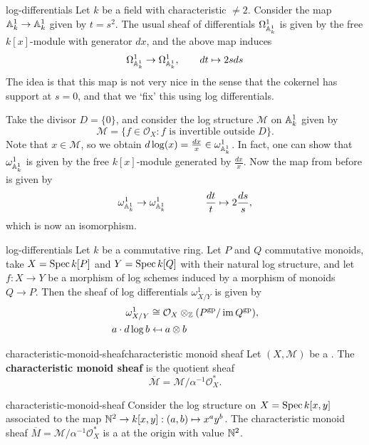 \begin{example}{log-differentials}
    Let $k$ be a field with characteristic $\ne 2$. Consider the map $\AA^1_k \to \AA^1_k$ given by $t = s^2$. The usual sheaf of differentials $\Omega^1_{\AA^1_k}$ is given by the free $k[x]$-module with generator $d x$, and the above map induces
    \[ \Omega^1_{\AA^1_k} \to \Omega^1_{\AA^1_k}, \qquad d t \mapsto 2 s d s \]
    The idea is that this map is not very nice in the sense that the cokernel has support at $s = 0$, and that we `fix' this using log differentials.
    
    Take the divisor $D = \{ 0 \}$, and consider the log structure $\mathcal{M}$ on $\AA^1_k$ given by
    \[ \mathcal{M} = \{ f \in \mathcal{O}_X : f \text{ is invertible outside } D \} . \]
    Note that $x \in \mathcal{M}$, so we obtain $d \log(x) = \frac{d x}{x} \in \omega^1_{\AA^1_k}$. In fact, one can show that $\omega^1_{\AA^1_k}$ is given by the free $k[x]$-module generated by $\frac{d x}{x}$. Now the map from before is given by
    \[ \omega^1_{\AA^1_k} \to \omega^1_{\AA^1_k} \qquad  \qquad \frac{d t}{t} \mapsto 2 \frac{d s} s , \]
    which is now an isomorphism.
\end{example}

\begin{example}{log-differentials}
    Let $k$ be a commutative ring. Let $P$ and $Q$ commutative monoids, take $X = \Spec k[P]$ and $Y = \Spec k[Q]$ with their natural log structure, and let $f \colon X \to Y$ be a morphism of log schemes induced by a morphism of monoids $Q \to P$. Then the sheaf of log differentials $\omega^1_{X/Y}$ is given by
    \[ \begin{aligned}
        \omega^1_{X/Y} &\isom \mathcal{O}_X \otimes_\ZZ (P^\textup{gp} / \operatorname{im} Q^\textup{gp}) , \\
        a \cdot d \log b  &\mapsfrom a \otimes b
    \end{aligned} \]
\end{example}

\begin{topic}{characteristic-monoid-sheaf}{characteristic monoid sheaf}
    Let $(X, \mathcal{M})$ be a . The \textbf{characteristic monoid sheaf} is the quotient sheaf
    \[ \overline{\mathcal{M}} = \mathcal{M} / \alpha^{-1} \mathcal{O}_X^* . \]
\end{topic}

\begin{example}{characteristic-monoid-sheaf}
    Consider the log structure on $X = \Spec k[x, y]$ associated to the map $\NN^2 \to k[x, y] : (a, b) \mapsto x^a y^b$. The characteristic monoid sheaf $\overline{M} = \mathcal{M} / \alpha^{-1} \mathcal{O}_X^*$ is a  at the origin with value $\NN^2$.
\end{example}
